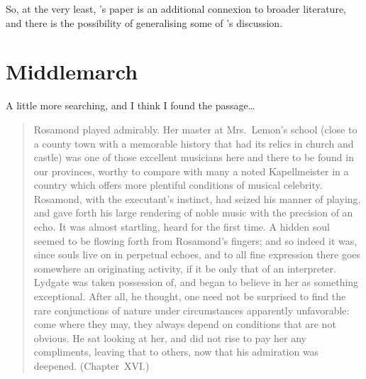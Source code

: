 \documentclass[10pt]{article}
\begin{document}
So, at the very least, \citeauthor{Buchak:2014aa}'s paper is an additional connexion to broader literature, and there is the possibility of generalising some of \citeauthor{Buchak:2014aa}'s discussion.

\section{Middlemarch}
\label{sec:middlemarch}

\begin{note}
  A little more searching, and I think I found the passage\dots
\end{note}

\begin{quote}
  Rosamond played admirably.
  Her master at Mrs.\ Lemon's school (close to a county town with a memorable history that had its relics in church and castle) was one of those excellent musicians here and there to be found in our provinces, worthy to compare with many a noted Kapellmeister in a country which offers more plentiful conditions of musical celebrity.
  Rosamond, with the executant's instinct, had seized his manner of playing, and gave forth his large rendering of noble music with the precision of an echo.
  It was almost startling, heard for the first time.
  A hidden soul seemed to be flowing forth from Rosamond's fingers; and so indeed it was, since souls live on in perpetual echoes, and to all fine expression there goes somewhere an originating activity, if it be only that of an interpreter.
  Lydgate was taken possession of, and began to believe in her as something exceptional.
  After all, he thought, one need not be surprised to find the rare conjunctions of nature under circumstances apparently
  unfavorable: come where they may, they always depend on conditions that are not obvious.
  He sat looking at her, and did not rise to pay her any compliments, leaving that to others, now that his admiration was deepened.\nolinebreak
  \mbox{}\hfill\mbox{(Chapter XVI.)}
\end{quote}

\newpage

\printbibliography
\end{document}
